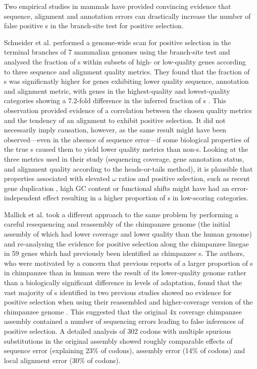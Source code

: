 Two empirical studies in mammals have provided convincing evidence
that sequence, alignment and annotation errors can drastically
increase the number of false positive \psg{}s in the branch-site test
for positive selection.

Schneider et al. \citeyearpar{Schneider2009Estimates} performed a
genome-wide scan for positive selection in the terminal branches of 7
mammalian genomes using the branch-site test and analysed the fraction
of \psg{}s within subsets of high- or low-quality genes according to
three sequence and alignment quality metrics. They found that the
fraction of \psg{}s was significnatly higher for genes exhibiting
lower quality sequence, annotation and alignment metric, with genes in
the highest-quality and lowest-quality categories showing a 7.2-fold
difference in the inferred fraction of \psg{}s
\citep{Schneider2009Estimates}. This observation provided evidence of
a correlation between the chosen quality metrics and the tendency of
an alignment to exhibit positive selection. It did not necessarily
imply causation, however, as the same result might have been
observed---even in the absence of sequence error---if some biological
properties of the true \psg{}s caused them to yield lower quality
metrics than non-\psg{}s. Looking at the three metrics used in their
study (sequencing coverage, gene annotation status, and alignment
quality according to the heads-or-tails method), it is plausible that
properties associated with elevated $\omega$ ratios and positive
selection, such as recent gene duplication \citep{TODO}, high GC
content \citep{TODO} or functional shifts \citep{TODO} might have had
an error-independent effect resulting in a higher proportion of
\psg{}s in low-scoring categories.

Mallick et al. \citeyearpar{Mallick2009Difficulty} took a different
approach to the same problem by performing a careful resequencing and
reassembly of the chimpanzee genome (the initial assembly of which had
lower coverage and lower quality than the human genome) and
re-analysing the evidence for positive selection along the chimpanzee
linegae in 59 genes which had previously been identified as chimpanzee
\psg{}s. The authors, who were motivated by a concern that previous
reports of a larger proportion of \psg{}s in chimpanzee than in human
\citep{TODO} were the result of its lower-quality genome rather than a
biologically significant difference in levels of adaptation, found
that the vast majority of \psg{}s identified in two previous studies
showed no evidence for positive selection when using their reassembled
and higher-coverage version of the chimpanzee genome
\citep{Mallick2009Difficulty}. This suggested that the original 4x
coverage chimpanzee assembly contained a number of sequencing errors
leading to false inferences of positive selection. A detailed analysis
of 302 codons with multiple spurious \nsyn substitutions in the
original assembly showed roughly comparable effects of sequence error
(explaining 23\% of codons), assembly error (14\% of codons) and local
alignment error (30\% of codons).

